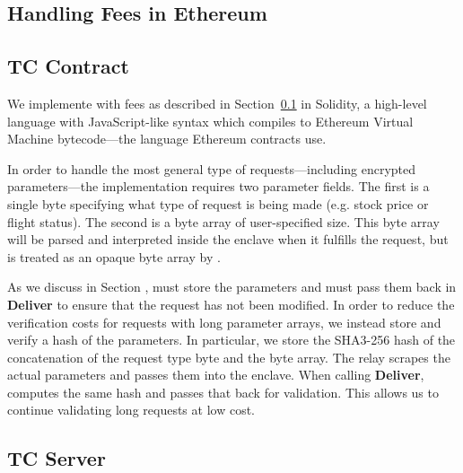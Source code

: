 \subsection{Handling Fees in Ethereum}
\label{sec:gas-protocol}





\subsection{TC Contract}

We implemente \tcont with fees as described in Section~\ref{sec:gas-protocol} in Solidity,
a high-level language with JavaScript-like syntax which compiles to Ethereum Virtual Machine bytecode---the language Ethereum contracts use.

In order to handle the most general type of requests---including encrypted parameters---the \tcont implementation requires two parameter fields.
The first is a single byte specifying what type of request is being made (e.g. stock price or flight status).
The second is a byte array of user-specified size.
This byte array will be parsed and interpreted inside the enclave when it fulfills the request, but is treated as an opaque byte array by \tcont.

As we discuss in Section , \tcont must store the parameters and \tc must pass them back in {\bf Deliver} to ensure that the request has not been modified.
In order to reduce the verification costs for requests with long parameter arrays, we instead store and verify a hash of the parameters.
In particular, we store the SHA3-256 hash of the concatenation of the request type byte and the byte array.
The relay scrapes the actual parameters and passes them into the enclave.
When calling {\bf Deliver}, \enclaveprog computes the same hash and passes that back for validation.
This allows us to continue validating long requests at low cost.



\subsection{TC Server}



